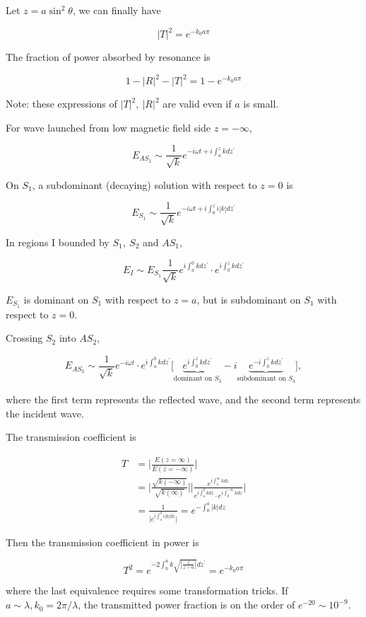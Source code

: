 \documentclass[
  notoc %
]{tufte-book}
\begin{document}
Let \(z=a\sin^2\theta\), we can finally have

\[
|T|^2 = e^{-k_0 a\pi}
\]

The fraction of power absorbed by resonance is

\[
1-|R|^2 - |T|^2 = 1-e^{-k_0 a \pi}
\]

Note: these expressions of \(|T|^2, \ |R|^2\) are valid even if \(a\) is
small.

For wave launched from low magnetic field side \(z=-\infty\),

\[
E_{AS_1} \sim\frac{1}{\sqrt{k}}e^{-i\omega t + i \int_a^z kdz^\prime}
\]

On \(S_1\), a subdominant (decaying) solution with respect to \(z=0\) is

\[
E_{S_1}\sim \frac{1}{\sqrt{k}}e^{-i\omega t+i\int_0^z i|k|dz^\prime}
\]

In regions I bounded by \(S_1,\ S_2\) and \(AS_1\),

\[
E_I \sim E_{S_1}\frac{1}{\sqrt{k}}e^{i\int_a^0 kdz^\prime}\cdot e^{i\int_0^z kdz^\prime}
\]

\(E_{S_1}\) is dominant on \(S_1\) with respect to \(z=a\), but is
subdominant on \(S_1\) with respect to \(z=0\).

Crossing \(S_2\) into \(AS_2\),

\[
E_{AS_2}\sim \frac{1}{\sqrt{k}}e^{-i\omega t}\cdot e^{i\int_a^0 kdz^\prime}\Big[ \underbrace{e^{i\int_0^z kdz^\prime}}_{\text{dominant on }S_3} - i \underbrace{e^{-i\int_0^z kdz^\prime}}_{\text{subdominant on }S_3} \Big],
\]

where the first term represents the reflected wave, and the second term
represents the incident wave.

The transmission coefficient is

\[
\begin{aligned}
T &= \Big| \frac{E(z=\infty)}{E(z=-\infty)} \Big| \\
&=\Big|\frac{\sqrt{k(-\infty)}}{\sqrt{k(\infty)}} \Big| \Big| \frac{e^{i\int_a^\infty kdz}}{e^{i\int_a^0 kdz}\cdot e^{i\int_0^{-\infty} kdz}} \Big| \\
&=\frac{1}{\big| e^{i\int_a^0 i|k|dz} \big|} = e^{-\int_0^a |k|dz}
\end{aligned}
\]

Then the transmission coefficient in power is

\[
T^2 = e^{-2\int_0^a k \sqrt{|\frac{z}{z-a}|}dz^\prime } = e^{-k_0 a \pi}
\]

where the last equivalence requires some transformation tricks. If
\(a\sim\lambda, k_0 = 2\pi/\lambda\), the transmitted power fraction is
on the order of \(e^{-20}\sim 10^{-9}\).
\end{document}
